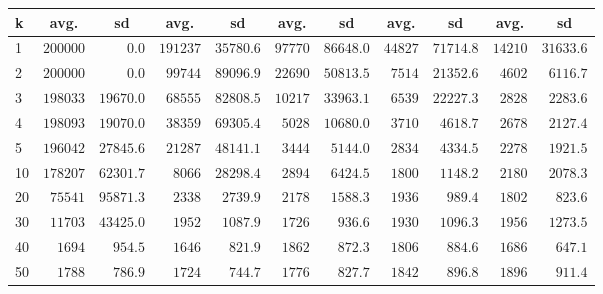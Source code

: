 \begin{landscape}
\begin{table}[H]
\begin{tabular}{lcccccccccc}
	k  & avg. & sd & avg. & sd & avg. & sd & avg. & sd & avg. & \multicolumn{1}{c}{sd} \\ 
\midrule
	1  & $200000$ & $\phantom{0000}0.0$ & $191237$ & $35780.6$ & $97770$ & $86648.0$ & $44827$ & $71714.8$ & $14210$ & $31633.6$ \\
	2  & $200000$ & $\phantom{0000}0.0$ & $\phantom{0}99744$ & $89096.9$ & $22690$ & $50813.5$ & $\phantom{0}7514$ & $21352.6$ & $\phantom{0}4602$ & $\phantom{0}6116.7$ \\
	3  & $198033$ & $19670.0$ & $\phantom{0}68555$ & $82808.5$ & $10217$ & $33963.1$ & $\phantom{0}6539$ & $22227.3$ & $\phantom{0}2828$ & $\phantom{0}2283.6$ \\
	4  & $198093$ & $19070.0$ & $\phantom{0}38359$ & $69305.4$ & $\phantom{0}5028$ & $10680.0$ & $\phantom{0}3710$ & $\phantom{0}4618.7$ & $\phantom{0}2678$ & $\phantom{0}2127.4$ \\
	5  & $196042$ & $27845.6$ & $\phantom{0}21287$ & $48141.1$ & $\phantom{0}3444$ & $\phantom{0}5144.0$ & $\phantom{0}2834$ & $\phantom{0}4334.5$ & $\phantom{0}2278$ & $\phantom{0}1921.5$ \\
	10  & $178207$ & $62301.7$ & $\phantom{00}8066$ & $28298.4$ & $\phantom{0}2894$ & $\phantom{0}6424.5$ & $\phantom{0}1800$ & $\phantom{0}1148.2$ & $\phantom{0}2180$ & $\phantom{0}2078.3$ \\
	20  & $\phantom{0}75541$ & $95871.3$ & $\phantom{00}2338$ & $\phantom{0}2739.9$ & $\phantom{0}2178$ & $\phantom{0}1588.3$ & $\phantom{0}1936$ & $\phantom{00}989.4$ & $\phantom{0}1802$ & $\phantom{00}823.6$ \\
	30  & $\phantom{0}11703$ & $43425.0$ & $\phantom{00}1952$ & $\phantom{0}1087.9$ & $\phantom{0}1726$ & $\phantom{00}936.6$ & $\phantom{0}1930$ & $\phantom{0}1096.3$ & $\phantom{0}1956$ & $\phantom{0}1273.5$ \\
	40  & $\phantom{00}1694$ & $\phantom{00}954.5$ & $\phantom{00}1646$ & $\phantom{00}821.9$ & $\phantom{0}1862$ & $\phantom{00}872.3$ & $\phantom{0}1806$ & $\phantom{00}884.6$ & $\phantom{0}1686$ & $\phantom{00}647.1$ \\
	50  & $\phantom{00}1788$ & $\phantom{00}786.9$ & $\phantom{00}1724$ & $\phantom{00}744.7$ & $\phantom{0}1776$ & $\phantom{00}827.7$ & $\phantom{0}1842$ & $\phantom{00}896.8$ & $\phantom{0}1896$ & $\phantom{00}911.4$ \\
\bottomrule
\end{tabular}

\end{table}



\end{landscape}
